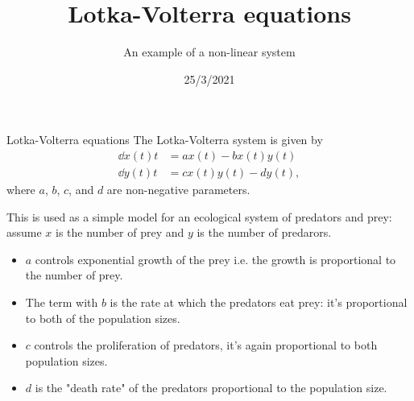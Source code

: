 

\title{Lotka-Volterra equations}
\subtitle{An example of a non-linear system}
\date{25/3/2021}
\date{}


	
	\maketitle
	

\begin{frame}{Lotka-Volterra equations}
	The Lotka-Volterra system is given by 
	\[ 
	\begin{split}
			\dd{x(t)}{t} &= a x(t) - b x(t) y(t) \\
			\dd{y(t)}{t} &= c x(t) y(t) - d y(t),
	\end{split}	
	\] 
	where $ a $, $ b $, $ c $, and $ d $ are non-negative parameters. 
	
	\pause
	This is used as a simple model for an ecological system of predators and prey: assume $ x $ is the number of prey and $ y $ is the number of predarors. 
	
	\pause
	\begin{itemize}
		\item $ a $ controls exponential growth of the prey i.e. the growth is proportional to the number of prey.
		\item The term with $ b $ is the rate at which the predators eat prey: it's proportional to both of the population sizes. 
		\item $ c $ controls the proliferation of predators, it's again proportional to both population sizes. 
		\item  $ d $ is the "death rate" of the predators proportional to the population size.
	\end{itemize}
\end{frame}

